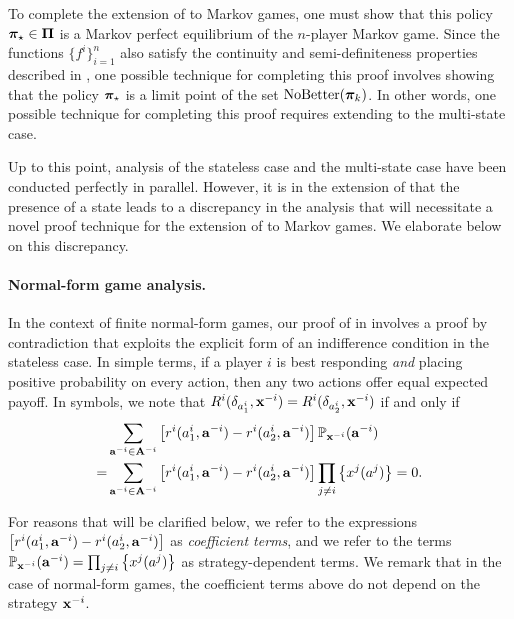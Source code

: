 To complete the extension of  to Markov games, one must show that this policy $\bm{\pi}_{\star} \in \bm{\Pi}$ is a Markov perfect equilibrium of the $n$-player Markov game. Since the functions $\{ f^i \}_{i = 1}^n$ also satisfy the continuity and semi-definiteness properties described in , one possible technique for completing this proof involves showing that the policy $\bm{\pi}_{\star}$ is a limit point of the set ${\rm NoBetter}(\bm{\pi}_k)$. In other words, one possible technique for completing this proof requires extending  to the multi-state case. 

Up to this point, analysis of the stateless case and the multi-state case have been conducted perfectly in parallel. However, it is in the extension of  that the presence of a state leads to a discrepancy in the analysis that will necessitate a novel proof technique for the extension of  to Markov games. We elaborate below on this discrepancy. %

\paragraph{Normal-form game analysis.} In the context of finite normal-form games, our proof of  in  involves a proof by contradiction that exploits the explicit form of an indifference condition in the stateless case. In simple terms, if a player $i$ is best responding \emph{and} placing positive probability on every action, then any two actions offer equal expected payoff. In symbols, we note that $R^i ( \delta_{a^i_1} , {\mathbf{x}}^{-i} ) = R^i ( \delta_{a^i_2} , {\mathbf{x}}^{-i} )$ if and only if
\begin{align*}
&\sum_{ {\mathbf{a}}^{-i} \in {\mathbf{A}}^{-i} } \left[ r^i ( a^i_1, {\mathbf{a}}^{-i} ) - r^i ( a^i_2, {\mathbf{a}}^{-i} ) \right] \mathbb{P}_{ {\mathbf{x}}^{-i} } ( {\mathbf{a}}^{-i } )  \\
= &\sum_{ {\mathbf{a}}^{-i} \in {\mathbf{A}}^{-i} } \left[ r^i ( a^i_1, {\mathbf{a}}^{-i} ) - r^i ( a^i_2, {\mathbf{a}}^{-i} ) \right] \prod_{ j \not= i} \left\{ x^j ( a^j ) \right\} = 0 . 
\end{align*}

For reasons that will be clarified below, we refer to the expressions $\left[ r^i ( a^i_1, {\mathbf{a}}^{-i} ) - r^i ( a^i_2, {\mathbf{a}}^{-i} ) \right]$ as \emph{coefficient terms}, and we refer to the terms $\mathbb{P}_{ {\mathbf{x}}^{-i} } ( {\mathbf{a}}^{-i} ) = \prod_{ j \not= i} \left\{ x^j ( a^j ) \right\}  $ as strategy-dependent terms. We remark that in the case of normal-form games, the coefficient terms above do not depend on the strategy ${\mathbf{x}}^{-i}$. 

